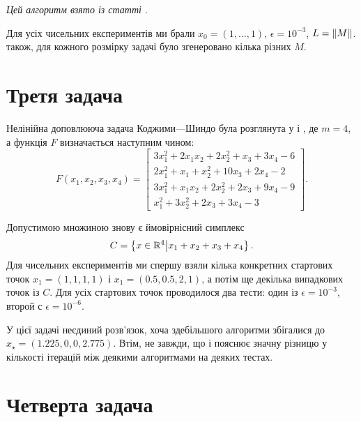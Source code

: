 \emph{Цей алгоритм взято із статті \cite{duchi-et-al}}. \medskip

Для усіх чисельних експериментів ми брали $x_0 = (1, \dots, 1)$, $\epsilon = 10^{-3}$, $L = \left\| M \right\|$. також, для кожного розмірку задачі було згенеровано кілька різних $M$.

\section{Третя задача}

Нелінійна доповлююча задача Коджими---Шиндо була розглянута у \cite{pang-gabriel} і \cite{kanzow}, де $m = 4$, а функція $F$ визначається наступним чином:
\begin{equation}
    F(x_1, x_2, x_3, x_4) = \begin{bmatrix}
        3 x_1^2 + 2 x_1 x_2 + 2 x_2^2 + x_3 + 3 x_4 - 6 \\
        2 x_1^2 + x_1 + x_2^2 + 10 x_3 + 2 x_4 - 2 \\
        3 x_1^2 + x_1 x_2 + 2 x_2^2 + 2 x_3 + 9 x_4 - 9 \\
        x_1^2 + 3 x_2^2 + 2 x_3 + 3 x_4 - 3
    \end{bmatrix}.
\end{equation}

Допустимою множиною знову є ймовірнісний симплекс \[C = \left\{ x \in \mathbb{R}^4 \middle| x_1 + x_2 + x_3 + x_4 \right\}.\] Для чисельних експериментів ми спершу взяли кілька конкретних стартових точок $x_1 = (1, 1, 1, 1)$ і $x_1 = (0.5, 0.5, 2, 1)$, а потім ще декілька випадкових точок із $C$. Для усіх стартових точок проводилося два тести: один із $\epsilon = 10^{-3}$, второй с $\epsilon = 10^{-6}$.

\begin{remark}
    У цієї задачі неєдиний розв'язок, хоча здебільшого алгоритми збігалися до $x_\star = (1.225, 0, 0, 2.775)$. Втім, не завжди, що і пояснює значну різницю у кількості ітерацій між деякими алгоритмами на деяких тестах.
\end{remark}

\section{Четверта задача}

